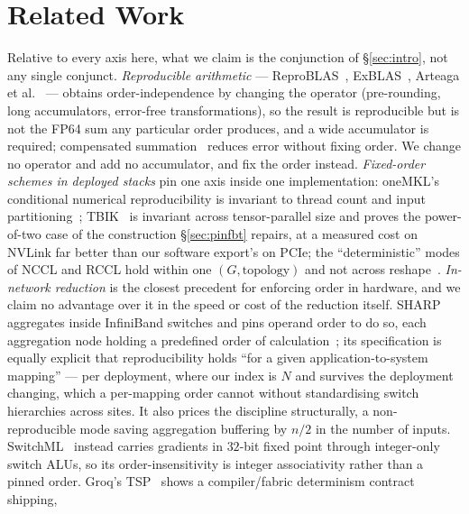 \documentclass[journal,10pt]{IEEEtran}
\theoremstyle{plain}
\theoremstyle{definition}
\theoremstyle{remark}
\begin{document}
\section{Related Work}\label{sec:related}

Relative to every axis here, what we claim is the conjunction of
\S\ref{sec:intro}, not any single conjunct.
\emph{Reproducible arithmetic} --- ReproBLAS~\cite{demmel2013reproBLAS},
ExBLAS~\cite{iakymchuk2016exblas}, Arteaga et
al.~\cite{arteaga2014bitreproducible} --- obtains order-independence by
changing the operator (pre-rounding, long accumulators, error-free
transformations), so the result is reproducible but is not the FP64 sum any
particular order produces, and a wide accumulator is required; compensated
summation~\cite{kahan1965summation} reduces error without fixing order. We
change no operator and add no accumulator, and fix the order instead.
\emph{Fixed-order schemes in deployed stacks} pin one axis inside one
implementation: oneMKL's conditional numerical reproducibility is invariant to
thread count and input partitioning~\cite{onemkl_cnr}; TBIK~\cite{tbik2025} is
invariant across tensor-parallel size and proves the power-of-two case of the
construction \S\ref{sec:pinfbt} repairs, at a measured cost on NVLink far
better than our software export's on PCIe; the ``deterministic'' modes of NCCL
and RCCL hold within one $(G,\text{topology})$ and not across
reshape~\cite{nccl2018,rccl2019}. \emph{In-network reduction} is the closest
precedent for enforcing order in hardware, and we claim no advantage over it in
the speed or cost of the reduction itself. SHARP~\cite{graham2016scalable}
aggregates inside InfiniBand switches and pins operand order to do so, each
aggregation node holding a predefined order of
calculation~\cite{mellanox2019aggregation}; its specification is equally
explicit that reproducibility holds ``for a given application-to-system
mapping'' --- per deployment, where our index is $N$ and survives the
deployment changing, which a per-mapping order cannot without standardising
switch hierarchies across sites. It also prices the discipline structurally, a
non-reproducible mode saving aggregation buffering by $n/2$ in the number of
inputs. SwitchML~\cite{sapio2021scaling} instead carries gradients in $32$-bit
fixed point through integer-only switch ALUs, so its order-insensitivity is
integer associativity rather than a pinned order. Groq's
TSP~\cite{abts2022groq} shows a compiler/fabric determinism contract shipping,
\end{document}
